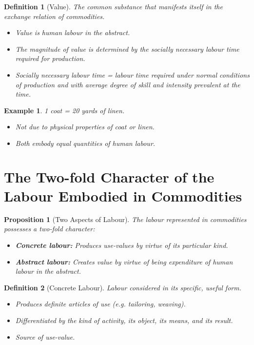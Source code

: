 \documentclass{article}
\newtheorem{innerdef}{Definition}
\newtheorem{innerprop}{Proposition}
\newtheorem{innerex}{Example}
\newenvironment{definition}{\begin{innerdef}}{\end{innerdef}}
\newenvironment{proposition}{\begin{innerprop}}{\end{innerprop}}
\newenvironment{example}{\begin{innerex}}{\end{innerex}}
\begin{document}
\begin{definition}[Value]\label{def:1.1.1.3}
The common substance that manifests itself in the exchange relation of commodities.
\begin{itemize}[noitemsep]
  \item Value is human labour in the abstract.
  \item The magnitude of value is determined by the socially necessary labour time required for production.
  \item Socially necessary labour time = labour time required under normal conditions of production and with average degree of skill and intensity prevalent at the time.
\end{itemize}
\end{definition}

\begin{example}
1 coat = 20 yards of linen.
\begin{itemize}[noitemsep]
  \item Not due to physical properties of coat or linen.
  \item Both embody equal quantities of human labour.
\end{itemize}
\end{example}

\newpage

\section{The Two-fold Character of the Labour Embodied in Commodities}

\begin{proposition}[Two Aspects of Labour]\label{prop:1.1.2.1}
The labour represented in commodities possesses a two-fold character:
\begin{itemize}[noitemsep]
  \item \textbf{Concrete labour:} Produces use-values by virtue of its particular kind.
  \item \textbf{Abstract labour:} Creates value by virtue of being expenditure of human labour in the abstract.
\end{itemize}
\end{proposition}

\begin{definition}[Concrete Labour]\label{def:1.1.2.1}
Labour considered in its specific, useful form.
\begin{itemize}[noitemsep]
  \item Produces definite articles of use (e.g. tailoring, weaving).
  \item Differentiated by the kind of activity, its object, its means, and its result.
  \item Source of use-value.
\end{itemize}
\end{definition}
\end{document}
